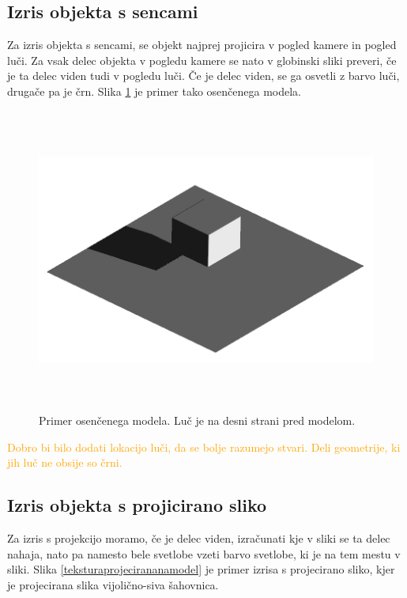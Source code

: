 \documentclass[a4paper, 12pt]{book}
\begin{document}
\subsection*{Izris objekta s sencami}
Za izris objekta s sencami, se objekt najprej projicira v pogled kamere in pogled luči. Za vsak delec objekta v pogledu kamere se nato v globinski sliki preveri, če je ta delec viden tudi v pogledu luči. Če je delec viden, se ga osvetli z barvo luči, drugače pa je črn. Slika \ref{osencenmodel} je primer tako osenčenega modela.

\begin{figure}[h]
\begin{center}
\includegraphics[width=12cm, height=10cm, keepaspectratio=true]{Osencen_model.png}
\end{center}
\caption{Primer osenčenega modela. Luč je na desni strani pred modelom.}
\label{osencenmodel}
\end{figure}
\textcolor{orange}{Dobro bi bilo dodati lokacijo luči, da se bolje razumejo stvari. Deli geometrije, ki jih luč ne obsije so črni.}

\subsection*{Izris objekta s projicirano sliko}
Za izris s projekcijo moramo, če je delec viden, izračunati kje v sliki se ta delec nahaja, nato pa namesto bele svetlobe vzeti barvo svetlobe, ki je na tem mestu v sliki. Slika \ref{teksturaprojecirananamodel} je primer izrisa s projecirano sliko, kjer je projecirana slika vijolično-siva šahovnica.
\end{document}
